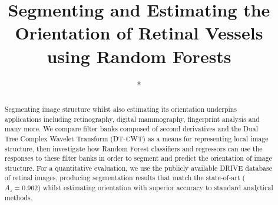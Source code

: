 \documentclass[runningheads,a4paper]{llncs}
\newcommand{\keywords}[1]{\par\addvspace\baselineskip
\noindent\keywordname\enspace\ignorespaces#1}
\def\dtcwt{DT-$\mathbb{C}$WT}
\begin{document}
\mainmatter  %

\title{Segmenting and Estimating the Orientation of Retinal Vessels using Random Forests}


%
%
\author{*}%
%

\institute{*}

%
%

\tocauthor{ }
\maketitle


\begin{abstract}
Segmenting image structure whilst also estimating its orientation underpins applications including retinography, digital mammography, fingerprint analysis and many more. We compare filter banks composed of second derivatives and the Dual Tree Complex Wavelet Transform (\dtcwt) as a means for representing local image structure, then investigate how Random Forest classifiers and regressors can use the responses to these filter banks in order to segment and predict the orientation of image structure. For a quantitative evaluation, we use the publicly available DRIVE database of retinal images, producing segmentation results that match the state-of-art ($A_z = 0.962$) whilst estimating orientation with superior accuracy to standard analytical methods.
\end{abstract}
\end{document}
